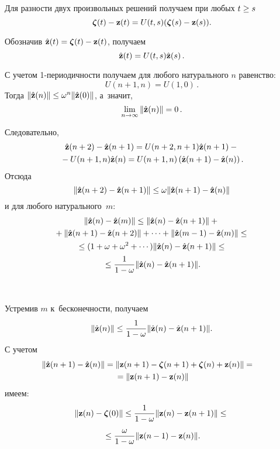\begin{multicols}{2}
Для разности двух произвольных решений получаем при любых $t \hm\ge s$
\begin{equation*}
\vzeta(t)-\vz(t)=U(t,s)(\vzeta(s)-\vz(s)).
\end{equation*}

Обозначив $\vhz(t)=\vzeta(t)\hm-\vz(t)$, получаем
\begin{equation*}
\vhz(t)=U(t,s)\vhz(s)\,.
\end{equation*}


С учетом 1-периодичности получаем для любого натурального $n$
равенство: 
$$
U(n+1,n)=U(1,0)\,.
$$
 Тогда $\|\vhz(n)\| \le \omega^n
\|\vhz(0)\|$, а~значит, 
$$
\lim\limits_{n\to \infty} \|\vhz(n)\|=0\,.
$$

Следовательно,
\begin{multline*}
\vhz(n+2)-\vhz(n+1)=U(n+2,n+1)\vhz(n+1)- {}\\
{}-
U(n+1,n)\vhz(n)=U(n+1,n)\left(\vhz(n+1)-\vhz(n)\right).
\end{multline*}
 Отсюда
\begin{equation*}
\|\vhz(n+2)-\vhz(n+1)\|\le \omega\|\vhz(n+1)-\vhz(n)\|
\end{equation*}
и для любого натурального~$m$:
\begin{multline*}
\|\vhz(n)-\vhz(m)\|\le \|\vhz(n)-\vhz(n+1)\|+{}\\
{}+ \|\vhz(n+1)-
\vhz(n+2)\|+\cdots 
+\|\vhz(m-1)-\vhz(m)\|
\le {}\\
{}\le
(1+\omega+\omega^2+\cdots)\|\vhz(n)-\vhz(n+1)\|\le{}\\
{}\le \fr
{1}{1-\omega}\|\vhz(n)-\vhz(n+1)\|.
\end{multline*}

\begin{figure*}[b]
\vspace*{1pt}
 \begin{center}
 \mbox{%
 \epsfxsize=110.178mm 
 }
 \end{center}
 \vspace*{-6pt}
\end{figure*}

Устремив $m$ к~бесконечности, получаем
\begin{equation*}
\|\vhz(n)\|\le \fr{1}{1-\omega}\|\vhz(n)-\vhz(n+1)\|.
\end{equation*}
С учетом
\begin{multline*}
\hspace*{-9pt}\|\vhz(n+1)-\vhz(n)\|=\|\vz(n+1)-
\vzeta(n+1)+\vzeta(n)+\vz(n)\|={}\hspace*{-0.46747pt}\\
{}=\|\vz(n+1)-\vz(n)\|
\end{multline*}
имеем:
\begin{multline*}
\|\vz(n)-\vzeta(0)\|\le \fr{1}{1-\omega}\|\vz(n)-\vz(n+1)\| \le{}\\
{}\le
\fr {\omega}{1-\omega}\|\vz(n-1)-\vz(n)\|.
\end{multline*}


\end{multicols}
